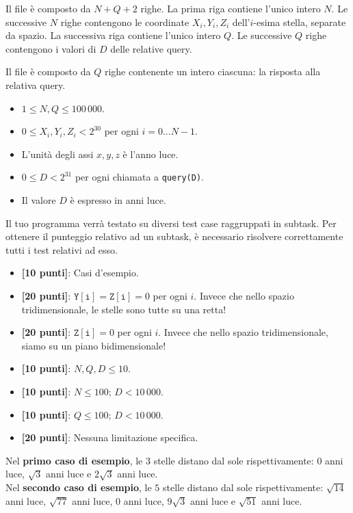 \InputFile
Il file  è composto da $N+Q+2$ righe. La prima riga contiene l'unico intero $N$. Le successive $N$ righe contengono le coordinate $X_i, Y_i, Z_i$ dell'$i$-esima stella, separate da spazio. La successiva riga contiene l'unico intero $Q$. Le successive $Q$ righe contengono i valori di $D$ delle relative query.

\OutputFile
Il file \outputfile{} è composto da $Q$ righe contenente un intero ciascuna: la risposta alla relativa query.

\Constraints
\begin{itemize}[nolistsep, itemsep=2mm]
  \item $1 \le N, Q \le 100\,000$.
  \item $0 \le X_i, Y_i, Z_i < 2^{30}$ per ogni $i=0\ldots N-1$.
  \item L'unità degli assi $x, y, z$ è l'anno luce.
  \item $0 \le D < 2^{31}$ per ogni chiamata a \texttt{query(D)}.
  \item Il valore $D$ è espresso in anni luce.
\end{itemize}

\Scoring
Il tuo programma verrà testato su diversi test case raggruppati in subtask.
Per ottenere il punteggio relativo ad un subtask, è necessario risolvere
correttamente tutti i test relativi ad esso.

\pagebreak
\begin{itemize}[nolistsep,itemsep=2mm]
  \item \textbf{ [10 punti]}: Casi d'esempio.
  \item \textbf{ [20 punti]}: $\mathtt{Y[i]} = \mathtt{Z[i]} = 0$ per ogni $i$. Invece che nello spazio tridimensionale, le stelle sono tutte su una retta!
  \item \textbf{ [20 punti]}: $\mathtt{Z[i]} = 0$ per ogni $i$. Invece che nello spazio tridimensionale, siamo su un piano bidimensionale!
  \item \textbf{ [10 punti]}: $N, Q, D \le 10$.
  \item \textbf{ [10 punti]}: $N \le 100$; $D < 10\,000$.
  \item \textbf{ [10 punti]}: $Q \le 100$; $D < 10\,000$.
  \item \textbf{ [20 punti]}: Nessuna limitazione specifica.
\end{itemize}



\Examples
\begin{example}
%
%
\end{example}


\Explanation
Nel \textbf{primo caso di esempio}, le $3$ stelle distano dal sole rispettivamente: $0$ anni luce, $\sqrt{3}$ anni luce e $2\sqrt{3}$ anni luce. \\[2mm]
Nel \textbf{secondo caso di esempio}, le $5$ stelle distano dal sole rispettivamente: $\sqrt{14}$ anni luce, $\sqrt{77}$ anni luce, $0$ anni luce, $9\sqrt{3}$ anni luce e $\sqrt{51}$ anni luce.
